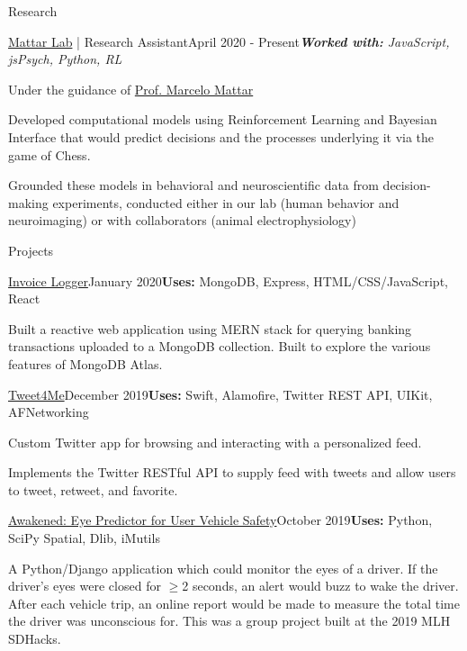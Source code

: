 \documentclass{resume} %
\begin{document}
\begin{rSection}{\faDatabase{ }}{Research} 

\begin{rSubsection}{}{\href{https://www.mattarlab.com/page}{Mattar Lab} | {\normalfont Research Assistant}}{April 2020 - Present}{\it \textbf{Worked with:} JavaScript, jsPsych, Python, RL}{}
\item Under the guidance of \href{http://marcelomattar.com/}{Prof. Marcelo Mattar}
\item Developed computational models using Reinforcement Learning and Bayesian Interface that would predict decisions and the processes underlying it via the game of Chess.
\item Grounded these models in behavioral and neuroscientific data from decision-making experiments, conducted either in our lab (human behavior and neuroimaging) or with collaborators (animal electrophysiology)

\end{rSubsection}
\end{rSection}




\begin{rSection}{\faDatabase{ }}{Projects} 

\begin{rSubsection}{}{\href{https://github.com/rainarit/invoice-logger}{Invoice Logger}}{January 2020}{\textbf{Uses:} MongoDB, Express, HTML/CSS/JavaScript, React}{}
\item Built	a reactive web application using MERN stack for querying banking transactions uploaded to a MongoDB collection. Built to explore the various features of MongoDB Atlas.
\end{rSubsection}
\begin{rSubsection}{}{\href{https://github.com/rainarit/tweet4me}{Tweet4Me}}{December 2019}{\textbf{Uses:} Swift, Alamofire, Twitter REST API, UIKit, AFNetworking}{}
\item Custom Twitter app for browsing and interacting with a personalized feed.
\item Implements the Twitter RESTful API to supply feed with tweets and allow users to tweet, retweet, and favorite.
\end{rSubsection}
\begin{rSubsection}{}{\href{https://github.com/rainarit/SDHacks2019_Awakened}{Awakened: Eye Predictor for User Vehicle Safety}}{October 2019}{\textbf{Uses: } Python, SciPy Spatial, Dlib, iMutils  }{}
\item A Python/Django application which could monitor the eyes of a driver. If the driver's eyes were closed for $\geq$2 seconds, an alert would buzz to wake the driver. After each vehicle trip, an online report would be made to measure the total time the driver was unconscious for. This was a group project built at the 2019 MLH SDHacks.
\end{rSubsection}
\end{rSection}


\end{document}

